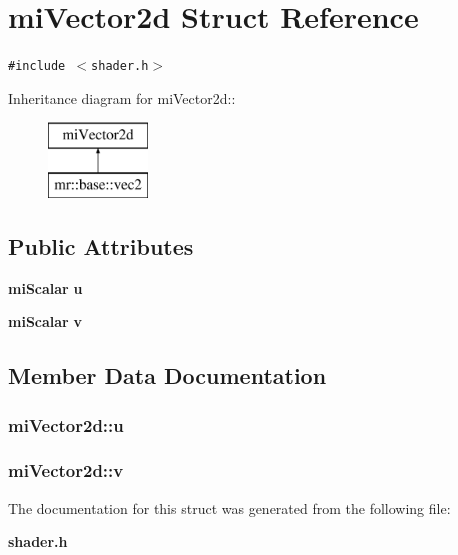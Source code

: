 \section{mi\-Vector2d Struct Reference}
\label{structmiVector2d}
{\tt \#include $<$shader.h$>$}

Inheritance diagram for mi\-Vector2d::\begin{figure}[H]
\begin{center}
\leavevmode
\includegraphics[height=2cm]{structmiVector2d}
\end{center}
\end{figure}
\subsection*{Public Attributes}
\begin{CompactItemize}
\item 
{\bf mi\-Scalar} {\bf u}
\item 
{\bf mi\-Scalar} {\bf v}
\end{CompactItemize}


\subsection{Member Data Documentation}
\subsubsection{ {\bf mi\-Vector2d::u}}\label{structmiVector2d_o0}


\subsubsection{ {\bf mi\-Vector2d::v}}\label{structmiVector2d_o1}




The documentation for this struct was generated from the following file:\begin{CompactItemize}
\item 
{\bf shader.h}\end{CompactItemize}
